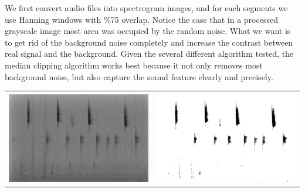 We first convert audio files into spectrogram images, and for each segments we use Hanning windows with \%75 overlap. Notice the case that in a processed grayscale image most area was occupied by the random noise. What we want is to get rid of the background noise completely and increase the contrast between real signal and the background. Given the several different algorithm tested, the median clipping algorithm works best because it not only removes most background noise, but also capture the sound feature clearly and precisely.

\begin{center}
\begin{tabular}{cc}
\begin{minipage}{1.8truein}
\includegraphics[height=1truein]{images/original}
\end{minipage}&
\begin{minipage}{1.8truein}
\includegraphics[height=1truein]{images/Median_clipped}

\end{minipage}
\end{tabular}
\end{center}
